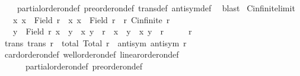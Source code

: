 \begin{isabellebody}
\ \ \ \ partial{\isacharunderscore}{\kern0pt}order{\isacharunderscore}{\kern0pt}on{\isacharunderscore}{\kern0pt}def\ preorder{\isacharunderscore}{\kern0pt}on{\isacharunderscore}{\kern0pt}def\ trans{\isacharunderscore}{\kern0pt}def\ antisym{\isacharunderscore}{\kern0pt}def\ \isamarkupfalse%
\ blast%
\endisatagproof
{\isafoldproof}%
%
\isadelimproof
\isanewline
%
\endisadelimproof
\isanewline
{}\isamarkupfalse%
\ Cinfinite{\isacharunderscore}{\kern0pt}limit{}{\isacharcolon}{\kern0pt}\isanewline
\ \ \ x{}{\isacharcolon}{\kern0pt}\ {\isachardoublequoteopen}x{}\ {\isasymin}\ Field\ r{\isachardoublequoteclose}\ \ x{}{\isacharcolon}{\kern0pt}\ {\isachardoublequoteopen}x{}\ {\isasymin}\ Field\ r{\isachardoublequoteclose}\ \ r{\isacharcolon}{\kern0pt}\ {\isachardoublequoteopen}Cinfinite\ r{\isachardoublequoteclose}\isanewline
\ \ \ {\isachardoublequoteopen}{\isasymexists}y\ {\isasymin}\ Field\ r{\isachardot}{\kern0pt}\ {\isacharparenleft}{\kern0pt}x{}\ {\isasymnoteq}\ y\ {\isasymand}\ {\isacharparenleft}{\kern0pt}x{}{\isacharcomma}{\kern0pt}\ y{\isacharparenright}{\kern0pt}\ {\isasymin}\ r{\isacharparenright}{\kern0pt}\ {\isasymand}\ {\isacharparenleft}{\kern0pt}x{}\ {\isasymnoteq}\ y\ {\isasymand}\ {\isacharparenleft}{\kern0pt}x{}{\isacharcomma}{\kern0pt}\ y{\isacharparenright}{\kern0pt}\ {\isasymin}\ r{\isacharparenright}{\kern0pt}{\isachardoublequoteclose}\isanewline
%
\isadelimproof
%
\endisadelimproof
%
\isatagproof
{}\isamarkupfalse%
\ {\isacharminus}{\kern0pt}\isanewline
\ \ \isamarkupfalse%
\ r\ \isamarkupfalse%
\ trans{\isacharcolon}{\kern0pt}\ {\isachardoublequoteopen}trans\ r{\isachardoublequoteclose}\ \ total{\isacharcolon}{\kern0pt}\ {\isachardoublequoteopen}Total\ r{\isachardoublequoteclose}\ \ antisym{\isacharcolon}{\kern0pt}\ {\isachardoublequoteopen}antisym\ r{\isachardoublequoteclose}\isanewline
\ \ \ \ \isamarkupfalse%
\ card{\isacharunderscore}{\kern0pt}order{\isacharunderscore}{\kern0pt}on{\isacharunderscore}{\kern0pt}def\ well{\isacharunderscore}{\kern0pt}order{\isacharunderscore}{\kern0pt}on{\isacharunderscore}{\kern0pt}def\ linear{\isacharunderscore}{\kern0pt}order{\isacharunderscore}{\kern0pt}on{\isacharunderscore}{\kern0pt}def\isanewline
\ \ \ \ \ \ partial{\isacharunderscore}{\kern0pt}order{\isacharunderscore}{\kern0pt}on{\isacharunderscore}{\kern0pt}def\ preorder{\isacharunderscore}{\kern0pt}on{\isacharunderscore}{\kern0pt}def\ \isamarkupfalse%

\end{isabellebody}
